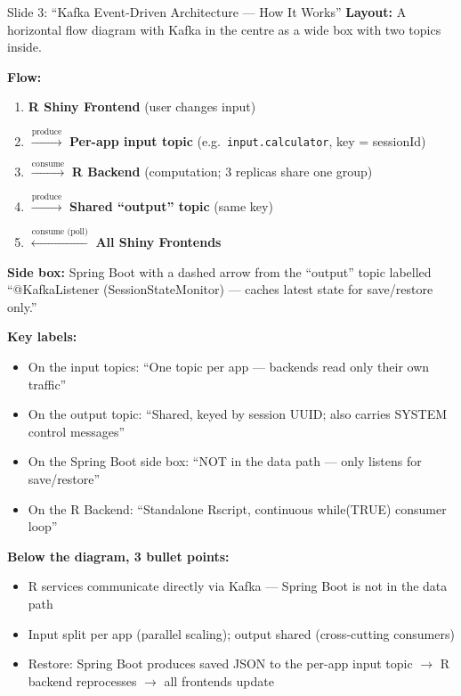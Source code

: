\documentclass[12pt,a4paper]{article}
\begin{document}
\begin{slidebox}{Slide 3: ``Kafka Event-Driven Architecture --- How It Works''}
\textbf{Layout:} A horizontal flow diagram with Kafka in the centre as a wide box with two topics inside.

\textbf{Flow:}
\begin{enumerate}[nosep]
  \item \textbf{R Shiny Frontend} (user changes input)
  \item $\xrightarrow{\text{produce}}$ \textbf{Per-app input topic} (e.g.\ \texttt{input.calculator}, key = sessionId)
  \item $\xrightarrow{\text{consume}}$ \textbf{R Backend} (computation; 3 replicas share one group)
  \item $\xrightarrow{\text{produce}}$ \textbf{Shared ``output'' topic} (same key)
  \item $\xleftarrow{\text{consume (poll)}}$ \textbf{All Shiny Frontends}
\end{enumerate}

\textbf{Side box:} Spring Boot with a dashed arrow from the ``output'' topic labelled ``@KafkaListener (SessionStateMonitor) --- caches latest state for save/restore only.''

\textbf{Key labels:}
\begin{itemize}[nosep]
  \item On the input topics: ``One topic per app --- backends read only their own traffic''
  \item On the output topic: ``Shared, keyed by session UUID; also carries SYSTEM control messages''
  \item On the Spring Boot side box: ``NOT in the data path --- only listens for save/restore''
  \item On the R Backend: ``Standalone Rscript, continuous while(TRUE) consumer loop''
\end{itemize}

\textbf{Below the diagram, 3 bullet points:}
\begin{itemize}[nosep]
  \item R services communicate directly via Kafka --- Spring Boot is not in the data path
  \item Input split per app (parallel scaling); output shared (cross-cutting consumers)
  \item Restore: Spring Boot produces saved JSON to the per-app input topic $\rightarrow$ R backend reprocesses $\rightarrow$ all frontends update
\end{itemize}
\end{slidebox}
\end{document}
